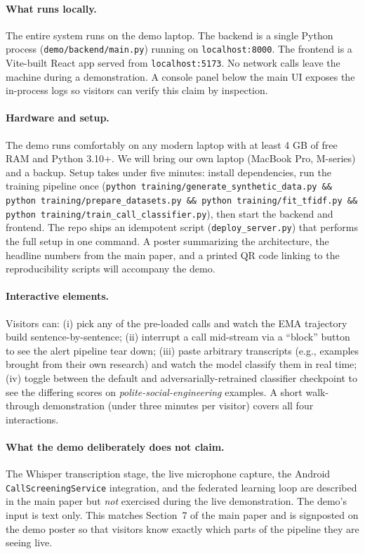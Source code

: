 \documentclass[11pt,a4paper]{article}
\begin{document}
\paragraph{What runs locally.}
The entire system runs on the demo laptop. The backend is a single
Python process (\texttt{demo/backend/main.py}) running on
\texttt{localhost:8000}. The frontend is a Vite-built React app
served from \texttt{localhost:5173}. No network calls leave the
machine during a demonstration. A console panel below the main UI
exposes the in-process logs so visitors can verify this claim by
inspection.

\paragraph{Hardware and setup.}
The demo runs comfortably on any modern laptop with at least 4 GB of
free RAM and Python 3.10+. We will bring our own laptop (MacBook Pro,
M-series) and a backup. Setup takes under five minutes: install
dependencies, run the training pipeline once
(\texttt{python training/generate\_synthetic\_data.py \&\& python
training/prepare\_datasets.py \&\& python training/fit\_tfidf.py \&\&
python training/train\_call\_classifier.py}), then start the backend
and frontend. The repo ships an idempotent script
(\texttt{deploy\_server.py}) that performs the full setup in one
command. A poster summarizing the architecture, the headline numbers
from the main paper, and a printed QR code linking to the
reproducibility scripts will accompany the demo.

\paragraph{Interactive elements.}
Visitors can: (i) pick any of the pre-loaded calls and watch the EMA
trajectory build sentence-by-sentence; (ii) interrupt a call mid-stream
via a ``block'' button to see the alert pipeline tear down; (iii)
paste arbitrary transcripts (e.g., examples brought from their own
research) and watch the model classify them in real time; (iv) toggle
between the default and adversarially-retrained classifier checkpoint
to see the differing scores on \textit{polite-social-engineering}
examples. A short walk-through demonstration (under three minutes per
visitor) covers all four interactions.

\paragraph{What the demo deliberately does not claim.}
The Whisper transcription stage, the live microphone capture, the
Android \texttt{CallScreeningService} integration, and the federated
learning loop are described in the main paper but \emph{not} exercised
during the live demonstration. The demo's input is text only. This
matches Section~7 of the main paper and is signposted on the demo
poster so that visitors know exactly which parts of the pipeline they
are seeing live.
\end{document}
